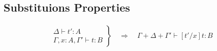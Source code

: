 \subsection{Substituions Properties}
\label{appendix:lemsubstitution}

\begin{lemma}
\label{lemma:substitution1}
\begin{align*}
    \left.
    \begin{aligned}
          \Delta \vdash t': A\\
          \Gamma,x:A,\Gamma' \vdash t:B
    \end{aligned}
    \right\}
    \hspace{1em}\Longrightarrow\hspace{1em}
    \Gamma + \Delta + \Gamma' \vdash [t'/x]t:B
\end{align*}
\end{lemma}

